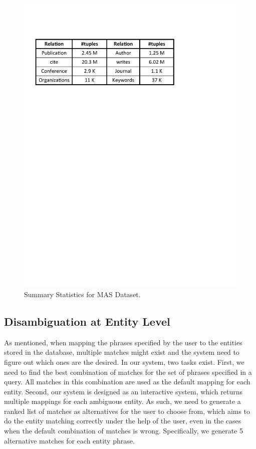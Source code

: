 \documentclass{vldb}
\begin{document}
\begin{figure}
  \center
  \includegraphics[width=0.8\linewidth]{pic/statistics.pdf}
  \caption{Summary Statistics for MAS Dataset.}
  \label{fig:statistics}
\end{figure}

\subsection{Disambiguation at Entity Level}
\label{subsec:disambiguationEntity}
As mentioned, when mapping the phrases specified by the user to the entities stored in the database, multiple matches might exist and the system need to figure out which ones are the desired.  In our system, two tasks exist.  First, we need to find the best combination of matches for the set of phrases specified in a query.  All matches in this combination are used as the default mapping for each entity.  Second, our system is designed as an interactive system, which returns multiple mappings for each ambiguous entity.  As such, we need to generate a ranked list of matches as alternatives for the user to choose from, which aims to do the entity matching correctly under the help of the user, even in the cases when the default combination of matches is wrong.  Specifically, we generate 5 alternative matches for each entity phrase. 
\end{document}
